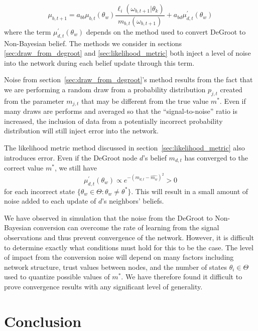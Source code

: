 \documentclass[a4paper,12pt]{article}
\begin{document}
\begin{equation}
\mu_{b,t+1} = a_{bb}\mu_{b,t}(\theta_w)\frac{\ell_i(\omega_{b,t+1}|\theta_k)}{m_{b,t}(\omega_{b,t+1})} + a_{bd}\mu_{d,t}^\prime(\theta_w)
\end{equation}
where the term $\mu_{d,t}^\prime(\theta_w)$ depends on the method used to convert DeGroot to Non-Bayesian belief.  The methods we consider in sections \ref{sec:draw_from_degroot} and \ref{sec:likelihood_metric} both inject a level of noise into the network during each belief update through this term.

Noise from section~\ref{sec:draw_from_degroot}'s method results from the fact that we are performing a random draw from a probability distribution $p_{j,t}$ created from the parameter $m_{j,t}$ that may be different from the true value $m^*$.  Even if many draws are performs and averaged so that the ``signal-to-noise'' ratio is increased, the inclusion of data from a potentially incorrect probability distribution will still inject error into the network.

The likelihood metric method discussed in section~\ref{sec:likelihood_metric} also introduces error.  Even if the DeGroot node $d$'s belief $m_{d,t}$ has converged to the correct value $m^*$, we still have
\begin{equation}
\mu_{d,t}^\prime(\theta_w) \propto e^{-(m_{d,t} - \hat{m_w})^2} > 0
\end{equation}
for each incorrect state $\{ \theta_w \in \Theta : \theta_w \neq \theta^* \}$.  This will result in a small amount of noise added to each update of $d$'s neighbors' beliefs.

We have observed in simulation that the noise from the DeGroot to Non-Bayesian conversion can overcome the rate of learning from the signal observations and thus prevent convergence of the network.  However, it is difficult to determine exactly what conditions must hold for this to be the case.  The level of impact from the conversion noise will depend on many factors including network structure, trust values between nodes, and the number of states $\theta_i \in \Theta$ used to quantize possible values of $m^*$.  We have therefore found it difficult to prove convergence results with any significant level of generality.

\section{Conclusion}




\end{document}
